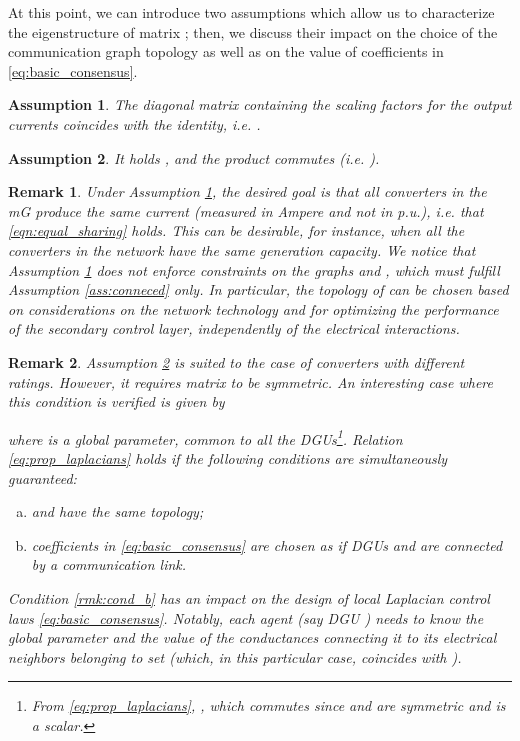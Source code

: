 \documentclass[a4paper]{article}
\theoremstyle{plain}
\newtheorem{ass}{Assumption}
\newtheorem{rmk}{Remark}
\begin{document}
	At this point, we can introduce two assumptions which allow us to characterize the eigenstructure of matrix ; then, we discuss their impact on the choice of the communication graph topology as well as on the value of coefficients  in \eqref{eq:basic_consensus}.
	\begin{ass}
		\label{ass:D_identity}
		The diagonal matrix containing the scaling factors for the output currents coincides with the identity, i.e. .  
	\end{ass}
	\begin{ass}
		\label{ass:same_topology}
It holds ,  and the product  commutes (i.e. ).
	\end{ass}
	\begin{rmk}
		Under Assumption \ref{ass:D_identity}, the desired goal is that all converters in the mG produce the same current (measured in Ampere and not in p.u.), i.e. that \eqref{eqn:equal_sharing} holds. This can be desirable, for instance, when all the converters in the network have the same generation capacity. We notice that Assumption \ref{ass:D_identity} does not enforce constraints on the graphs  and , which must fulfill Assumption \ref{ass:conneced} only. In particular, the topology of  can be chosen based on considerations on the network technology and for optimizing the performance of the secondary control layer, independently of the electrical interactions.
	\end{rmk}
	\begin{rmk}
		\label{rmk:same_topology}
		Assumption \ref{ass:same_topology} is suited to the case of converters with different ratings. However, it requires matrix  to be symmetric. An interesting case where this condition is verified is given by 
		
		where  is a global parameter, common to all the DGUs\footnote{From \eqref{eq:prop_laplacians}, , which commutes since  and  are symmetric and  is a scalar.}. Relation \eqref{eq:prop_laplacians} holds if the following conditions are simultaneously guaranteed:
		\begin{enumerate}[(a)]
			\item  and  have the same topology;
			\item \label{rmk:cond_b}coefficients in \eqref{eq:basic_consensus} are chosen as  if DGUs  and  are connected by a communication link.
		\end{enumerate} 
		Condition \eqref{rmk:cond_b} has an impact on the design of local Laplacian control laws \eqref{eq:basic_consensus}. Notably, each agent (say DGU ) needs to know the global parameter  and the value of the conductances  connecting it to its electrical neighbors  belonging to set  (which, in this particular case, coincides with ).
	\end{rmk}
\end{document}
